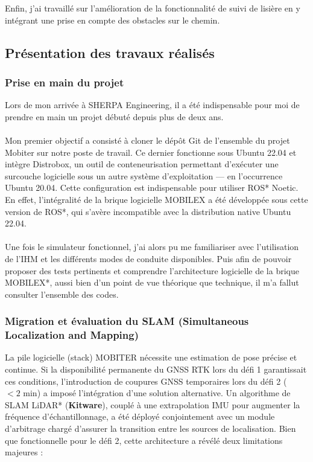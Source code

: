 \indent Enfin, j'ai travaillé sur l'amélioration de la fonctionnalité de suivi de lisière en y intégrant une prise en compte des obstacles sur le chemin.


\subsection{Présentation des travaux réalisés}

\subsubsection{Prise en main du projet}
Lors de mon arrivée à SHERPA Engineering, il a été indispensable pour moi de prendre en main un projet débuté depuis plus de deux ans.\\\\
\indent Mon premier objectif a consisté à cloner le dépôt Git de l'ensemble du projet Mobiter sur notre poste de travail. Ce dernier fonctionne sous Ubuntu 22.04 et intègre Distrobox, un outil de conteneurisation permettant d'exécuter une surcouche logicielle sous un autre système d'exploitation — en l'occurrence Ubuntu 20.04. Cette configuration est indispensable pour utiliser ROS* Noetic. En effet, l'intégralité de la brique logicielle MOBILEX a été développée sous cette version de ROS*, qui s'avère incompatible avec la distribution native Ubuntu 22.04. \\\\
\indent Une fois le simulateur fonctionnel, j'ai alors pu me familiariser avec l'utilisation de l'IHM et les différents modes de conduite disponibles. Puis afin de pouvoir proposer des tests pertinents et comprendre l'architecture logicielle de la brique MOBILEX*, aussi bien d'un point de vue théorique que technique, il m'a fallut consulter l'ensemble des codes.

\subsubsection{Migration et évaluation du SLAM (Simultaneous Localization and Mapping)}

La pile logicielle (stack) MOBITER nécessite une estimation de pose précise et continue. Si la disponibilité permanente du GNSS RTK lors du défi 1 garantissait ces conditions, l'introduction de coupures GNSS temporaires lors du défi 2 ($< 2\text{ min}$) a imposé l'intégration d'une solution alternative. Un algorithme de SLAM LiDAR* (\textbf{Kitware}), couplé à une extrapolation IMU pour augmenter la fréquence d'échantillonnage, a été déployé conjointement avec un module d'arbitrage chargé d'assurer la transition entre les sources de localisation. Bien que fonctionnelle pour le défi 2, cette architecture a révélé deux limitations majeures : \\

